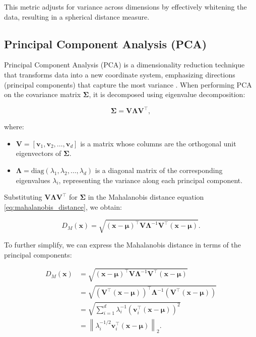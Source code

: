 This metric adjusts for variance across dimensions by effectively whitening the data, resulting in a spherical distance measure.

\subsection{Principal Component Analysis (PCA)}

Principal Component Analysis (PCA) is a dimensionality reduction technique that transforms data into a new coordinate system, emphasizing directions (principal components) that capture the most variance \citep{jolliffe2002principal}. When performing PCA on the covariance matrix $\boldsymbol{\Sigma}$, it is decomposed using eigenvalue decomposition:

\begin{equation}
    \label{eq:pca_decomposition}
    \boldsymbol{\Sigma} = \mathbf{V} \boldsymbol{\Lambda} \mathbf{V}^\top,
\end{equation}

where:
\begin{itemize}
    \item $\mathbf{V} = [\mathbf{v}_1, \mathbf{v}_2, \dots, \mathbf{v}_d]$ is a matrix whose columns are the orthogonal unit eigenvectors of $\boldsymbol{\Sigma}$.
    \item $\boldsymbol{\Lambda} = \text{diag}(\lambda_1, \lambda_2, \dots, \lambda_d)$ is a diagonal matrix of the corresponding eigenvalues $\lambda_i$, representing the variance along each principal component.
\end{itemize}

Substituting $\mathbf{V} \boldsymbol{\Lambda} \mathbf{V}^\top$ for $\boldsymbol{\Sigma}$ in the Mahalanobis distance equation \eqref{eq:mahalanobis_distance}, we obtain:

\begin{equation}
    \label{eq:mahalanobis_pca}
    D_M(\mathbf{x}) = \sqrt{ (\mathbf{x} - \boldsymbol{\mu})^\top \mathbf{V} \boldsymbol{\Lambda}^{-1} \mathbf{V}^\top (\mathbf{x} - \boldsymbol{\mu}) }.
\end{equation}

To further simplify, we can express the Mahalanobis distance in terms of the principal components:

\begin{align}
D_M(\mathbf{x}) &= \sqrt{ (\mathbf{x} - \boldsymbol{\mu})^\top \mathbf{V} \boldsymbol{\Lambda}^{-1} \mathbf{V}^\top (\mathbf{x} - \boldsymbol{\mu}) } \nonumber \\
&= \sqrt{ (\mathbf{V}^\top (\mathbf{x} - \boldsymbol{\mu}))^\top \boldsymbol{\Lambda}^{-1} (\mathbf{V}^\top (\mathbf{x} - \boldsymbol{\mu})) } \nonumber \\
&= \sqrt{ \sum_{i=1}^{d} \lambda_i^{-1} \left( \mathbf{v}_i^\top (\mathbf{x} - \boldsymbol{\mu}) \right)^2 } \nonumber \\
&= \left\| \lambda_i^{-1/2} \mathbf{v}_i^\top (\mathbf{x} - \boldsymbol{\mu}) \right\|_2.
\label{eq:mahalanobis_pca_l2}
\end{align}

